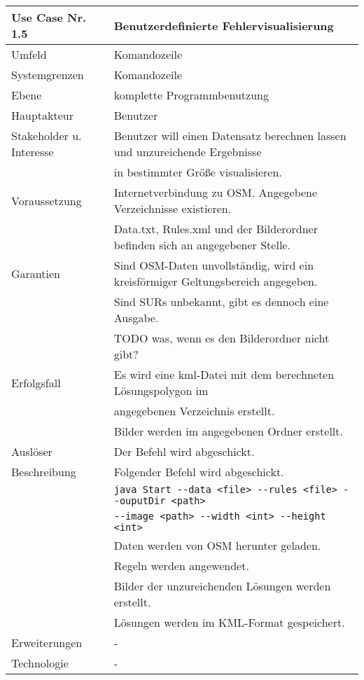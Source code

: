 \begin{tabular}{| l | l |}
 \hline
 \textbf{Use Case Nr. 1.5} & Benutzerdefinierte Fehlervisualisierung\\
 \hline
 Umfeld & Komandozeile\\
 \hline
 Systemgrenzen & Komandozeile\\
 \hline
 Ebene & komplette Programmbenutzung\\
 \hline
 Hauptakteur & Benutzer\\
 \hline
 Stakeholder u. Interesse & Benutzer will einen Datensatz berechnen lassen und unzureichende Ergebnisse\\
			  & in bestimmter Größe visualisieren.\\
 \hline
 Voraussetzung & Internetverbindung zu OSM. Angegebene Verzeichnisse existieren.\\
	      & Data.txt, Rules.xml und der Bilderordner befinden sich an angegebener Stelle. \\
 \hline
 Garantien & Sind OSM-Daten unvollständig, wird ein kreisförmiger Geltungsbereich angegeben.\\
	  & Sind SURs unbekannt, gibt es dennoch eine Ausgabe.\\
	  & TODO was, wenn es den Bilderordner nicht gibt?\\
 \hline
 Erfolgsfall & Es wird eine kml-Datei mit dem berechneten Lösungspolygon im\\
	    & angegebenen Verzeichnis erstellt.\\
	    & Bilder werden im angegebenen Ordner erstellt.\\
 \hline
 Auslöser & Der Befehl wird abgeschickt.\\
 \hline
 Beschreibung & Folgender Befehl wird abgeschickt.\\
	    & \verb|java Start --data <file> --rules <file> --ouputDir <path>|\\
	    & \hspace{24pt} \verb|--image <path> --width <int> --height <int>|\\
	    & Daten werden von OSM herunter geladen.\\
	    & Regeln werden angewendet.\\
	    & Bilder der unzureichenden Lösungen werden erstellt.\\
	    & Lösungen werden im KML-Format gespeichert.\\
 \hline
 Erweiterungen & -\\
 \hline
 Technologie & -\\
 \hline
\end{tabular}
